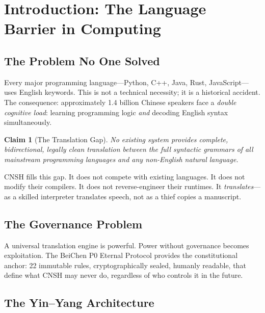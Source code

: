 \documentclass[conference]{IEEEtran}
\newtheorem{claim}{Claim}
\begin{document}
\section{Introduction: The Language Barrier in Computing}

\subsection{The Problem No One Solved}

Every major programming language---Python, C++, Java, Rust,
JavaScript---uses English keywords.
This is not a technical necessity; it is a historical accident.
The consequence: approximately 1.4 billion Chinese speakers
face a \emph{double cognitive load}: learning programming logic
\emph{and} decoding English syntax simultaneously.

\begin{claim}[The Translation Gap]
No existing system provides complete, bidirectional, legally clean
translation between the full syntactic grammars of all mainstream
programming languages and any non-English natural language.
\end{claim}

CNSH fills this gap.
It does not compete with existing languages.
It does not modify their compilers.
It does not reverse-engineer their runtimes.
It \emph{translates}---as a skilled interpreter translates speech,
not as a thief copies a manuscript.

\subsection{The Governance Problem}

A universal translation engine is powerful.
Power without governance becomes exploitation.
The BeiChen P0 Eternal Protocol provides the constitutional
anchor: 22 immutable rules, cryptographically sealed,
humanly readable, that define what CNSH may never do,
regardless of who controls it in the future.

\subsection{The Yin--Yang Architecture}
\end{document}
